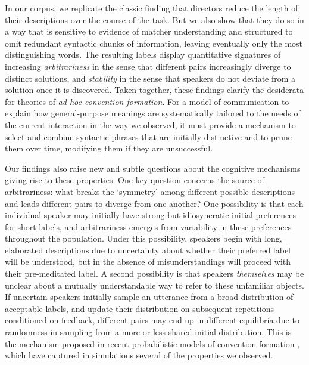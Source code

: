 \documentclass[alpha-refs]{wiley-article}
\begin{document}

In our corpus, we replicate the classic finding that directors reduce the length of their descriptions over the course of the task. But we also show that they do so in a way that is sensitive to evidence of matcher understanding and structured to omit redundant syntactic chunks of information, leaving eventually only the most distinguishing words.
The resulting labels display quantitative signatures of increasing \emph{arbitrariness} in the sense that different pairs increasingly diverge to distinct solutions, and \emph{stability} in the sense that speakers do not deviate from a solution once it is discovered.
Taken together, these findings clarify the desiderata for theories of \emph{ad hoc convention formation}.
For a model of communication to explain how general-purpose meanings are systematically tailored to the needs of the current interaction in the way we observed, it must provide a mechanism to select and combine syntactic phrases that are initially distinctive and to prune them over time, modifying them if they are unsuccessful.

Our findings also raise new and subtle questions about the cognitive mechanisms giving rise to these properties.
One key question concerns the source of arbitrariness: what breaks the `symmetry' among different possible descriptions and leads different pairs to diverge from one another?
One possibility is that each individual speaker may initially have strong but idiosyncratic initial preferences for short labels, and arbitrariness emerges from variability in these preferences throughout the population.
Under this possibility, speakers begin with long, elaborated descriptions due to uncertainty about whether their preferred label will be understood, but in the absence of misunderstandings will proceed with their pre-meditated label.
A second possibility is that speakers \emph{themselves} may be unclear about a mutually understandable way to refer to these unfamiliar objects.
If uncertain speakers initially sample an utterance from a broad distribution of acceptable labels, and update their distribution on subsequent repetitions conditioned on feedback, different pairs may end up in different equilibria due to randomness in sampling from a more or less shared initial distribution. 
This is the mechanism proposed in recent probabilistic models of convention formation \citep{smith_learning_2013,hawkins_convention-formation_2017,Brochagen17}, which have captured in simulations several of the properties we observed.
\end{document}
